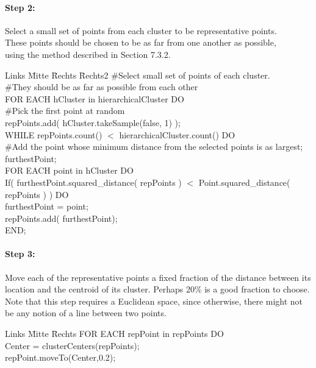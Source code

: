 \documentclass[11pt,a4paper]{scrartcl}
\begin{document}
\paragraph{Step 2:}
Select a small set of points from each cluster to be representative points. \\
These points should be chosen to be as far from one another as possible, \\
using the method described in Section 7.3.2.
\begin{tabbing}
Links \= Mitte \= Rechts  \=Rechts2 \kill
\#Select small set of points of each cluster. \\
\#They should be as far as possible from each other\\
FOR EACH hCluster in hierarchicalCluster DO\\
\>\#Pick the first point at random\\
\>\>	repPoints.add( hCluster.takeSample(false, 1) );\\
\>WHILE repPoints.count() $<$ hierarchicalCluster.count() DO\\
\>\#Add the point whose minimum distance from the selected points is as largest; \\
\>furthestPoint;\\
\>FOR EACH point in hCluster DO\\
\> \>		If( furthestPoint.squared\_distance( repPoints ) $<$ 
			Point.squared\_distance( repPoints ) ) DO\\
\> \>	\>		furthestPoint = point;\\
\>repPoints.add( furthestPoint);\\
END;
\end{tabbing}
\paragraph{Step 3:}
Move each of the representative points a fixed fraction of the distance between its location and the centroid of its cluster. Perhaps 20\% is a good fraction to choose. Note that this step requires a Euclidean space, since otherwise, there might not be any notion of a line between two points.

\begin{tabbing}
Links \= Mitte \= Rechts \kill
\> FOR EACH repPoint in repPoints DO\\
\> \> 	Center = clusterCenters(repPoints);\\
\> \> 	repPoint.moveTo(Center,0.2);
\end{tabbing}
\end{document}
